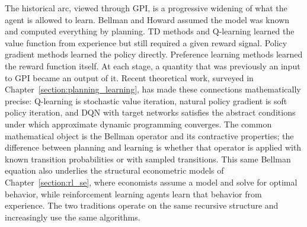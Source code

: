 The historical arc, viewed through GPI, is a progressive widening of what the agent is allowed to learn. Bellman and Howard assumed the model was known and computed everything by planning. TD methods and Q-learning learned the value function from experience but still required a given reward signal. Policy gradient methods learned the policy directly. Preference learning methods learned the reward function itself. At each stage, a quantity that was previously an input to GPI became an output of it. Recent theoretical work, surveyed in Chapter~\ref{section:planning_learning}, has made these connections mathematically precise: Q-learning is stochastic value iteration, natural policy gradient is soft policy iteration, and DQN with target networks satisfies the abstract conditions under which approximate dynamic programming converges. The common mathematical object is the Bellman operator and its contractive properties; the difference between planning and learning is whether that operator is applied with known transition probabilities or with sampled transitions. This same Bellman equation also underlies the structural econometric models of Chapter~\ref{section:rl_se}, where economists assume a model and solve for optimal behavior, while reinforcement learning agents learn that behavior from experience. The two traditions operate on the same recursive structure and increasingly use the same algorithms.

